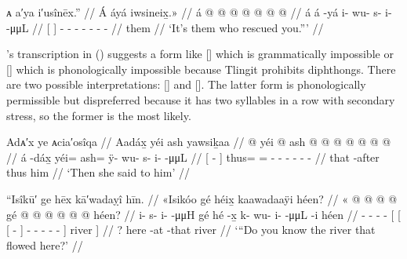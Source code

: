 \ex\label{ex:100-61-they-rescued-you}%
%
\begingl
	\glpreamble	ᴀ a′ya i′usînēx.” //
	\glpreamble	Á áyá iwsineix̱.\!» //
	\gla	{} á {}  @ {}
		 @ {} @ {} @ {} @ {} @ {} @ {} //
	\glb	{} á {} á -yá
		i- wu- {} s- i-  -μμL //
	\glc	{}[  {}]  -
		- - - - -  - //
	\gld	{} them {}  {}
		 {} {} {} {} {} {} //
	\glft	‘It’s them who rescued you.”’
		//
\endgl
\xe

\citeauthor{swanton:1909}’s transcription  in (\lastx) suggests a form like  [] which is grammatically impossible or  [] which is phonologically impossible because Tlingit prohibits diphthongs.
There are two possible interpretations:  [] and  [].
The latter form is phonologically permissible but dispreferred because it has two syllables in a row with secondary stress, so the former is the most likely.

\ex\label{ex:100-62-then-she-said}%
%
\begingl
	\glpreamble	Adᴀ′x ye ᴀcia′osîqa //
	\glpreamble	Aadáx̱ yéi ash yawsiḵaa //
	\gla	{}  @ {} {}
		yéi @ ash @  @ {} @ {} @ {} @ {} @ {} @ {} //
	\glb	{} á -dáx̱ {}
		yéi= ash= ÿ- wu- {} s- i-  -μμL //
	\glc	{}[  - {}]
		thus= = - - - - -  - //
	\gld	{} that -after {}
		thus him  {} {} {} {} {} {} //
	\glft	‘Then she said to him’
		//
\endgl
\xe

\ex\label{ex:100-63-river-that-flowed}%
%
\begingl
	\glpreamble	“Isîkū′ ge hēx kā′wadaỵî hīn. //
	\glpreamble	«\!Isikóo gé héix̱ kaawadaaÿi héen? //
	\gla	«\! @ {} @ {} @ {} @ {} gé 
		{} {} {}  @ {} {}
			 @ {} @ {} @ {} @ {} @ {} {}
			héen? {} //
	\glb	\pqp{}i- s- i-  -μμH gé
		{} {} {} hé -x̱ {}
			k- wu- i-  -μμL -i {}
		héen {} //
	\glc	\pqp{}- - -  - 
		{}[ {}[ [  - {}]
			- - -  - - {}]
			river {}] //
	\gld	\pqp{} {} {} {} {} ?
		{} {} {} here -at {}
			 {} {} {} {} -that {}
			river {} //
	\glft	‘“Do you know the river that flowed here?’
		//
\endgl
\xe

